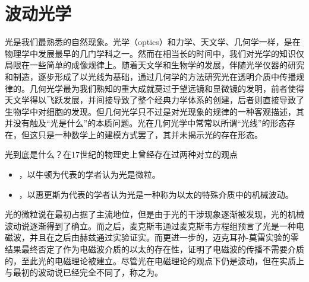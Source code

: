 \chapter{波动光学}
光是我们最熟悉的自然现象。光学（optics）和力学、天文学、几何学一样，是在物理学中发展最早的几门学科之一。然而在相当长的时间中，我们对光学的知识仅局限在一些简单的成像规律上。随着天文学和生物学的发展，伴随光学仪器的研究和制造，逐步形成了以光线为基础，通过几何学的方法研究光在透明介质中传播规律的。几何光学最为我们熟知的重大成就莫过于望远镜和显微镜的发明，前者使得天文学得以飞跃发展，并间接导致了整个经典力学体系的创建，后者则直接导致了生物学中对细胞的发现。但几何光学只不过是对光现象的规律的一种客观描述，其并没有触及“光是什么”的本质问题。光在几何光学中常常以所谓“光线”的形态存在，但这只是一种数学上的建模方式罢了，其并未揭示光的存在形态。

光到底是什么？在17世纪的物理史上曾经存在过两种对立的观点
\begin{itemize}
    \item {}，以牛顿为代表的学者认为光是微粒。
    \item {}，以惠更斯为代表的学者认为光是一种称为以太的特殊介质中的机械波动。
\end{itemize}
光的微粒说在最初占据了主流地位，但是由于光的干涉现象逐渐被发现，光的机械波动说逐渐得到了确立。而之后，麦克斯韦通过麦克斯韦方程组预言了光是一种电磁波，并且在之后由赫兹通过实验证实。而更进一步的，迈克耳孙-莫雷实验的零结果最终否定了作为电磁波介质的以太的存在性，证明了电磁波的传播不需要介质的，至此光的电磁理论被建立。尽管光在电磁理论的观点下仍是波动，但在实质上与最初的波动说已经完全不同了，称之为。







